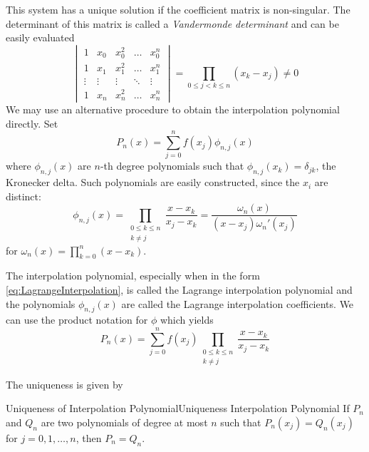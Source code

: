 \documentclass[../main.tex]{subfiles}
\begin{document}
This system has a unique solution if the coefficient matrix is non-singular. The determinant of this matrix is called a \emph{Vandermonde determinant} and can be easily evaluated
\begin{equation}
	\begin{vmatrix}
		1      & x_0    & x_0^2  & \dots  & x_0^n  \\
		1      & x_1    & x_1^2  & \dots  & x_1^n  \\
		\vdots & \vdots & \vdots & \ddots & \vdots \\
		1      & x_n    & x_n^2  & \dots  & x_n^n
	\end{vmatrix} = \prod_{0 \leq j < k \leq n} (x_k - x_j) \neq 0
\end{equation}
We may use an alternative procedure to obtain the interpolation polynomial directly. Set
\begin{equation}\label{eq:LagrangeInterpolation}
	P_n(x) = \sum_{j=0}^n f(x_j) \phi_{n,j}(x)
\end{equation}
where $\phi_{n,j}(x)$ are $n$-th degree polynomials such that $\phi_{n,j}(x_k) = \delta_{jk}$, the Kronecker delta. Such polynomials are easily constructed, since the $x_i$ are distinct:
\begin{equation}\label{eq:LagrangeInterpolationCoefficients}
	\phi_{n,j}(x) = \prod_{\substack{0 \leq k \leq n \\ k \neq j}} \frac{x - x_k}{x_j - x_k} = \frac{\omega_n(x)}{(x - x_j) \omega_n'(x_j)}
\end{equation}
for $\omega_n(x) = \prod_{k=0}^n (x - x_k)$.

The interpolation polynomial, especially when in the form \eqref{eq:LagrangeInterpolation}, is called the Lagrange interpolation polynomial and the polynomials $\phi_{n,j}(x)$ are called the Lagrange interpolation coefficients. We can use the product notation for $\phi$ which yields
\begin{equation}
	P_n(x) = \sum_{j=0}^n f(x_j) \prod_{\substack{0 \leq k \leq n \\ k \neq j}} \frac{x - x_k}{x_j - x_k}
\end{equation}

The uniqueness is given by
\begin{lemma}{Uniqueness of Interpolation Polynomial}{Uniqueness Interpolation Polynomial}
	If $P_n$ and $Q_n$ are two polynomials of degree at most $n$ such that $P_n(x_j) = Q_n(x_j)$ for $j = 0, 1, \dots, n$, then $P_n = Q_n$.
\end{lemma}
\end{document}
